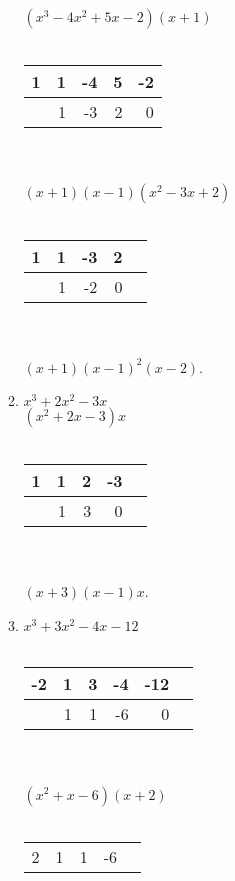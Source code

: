 \documentclass[10pt]{book}
\begin{document}
\begin{enumerate}
\begin{enumerate}
			\\
			\\
			$(x^3 - 4x^2 + 5x - 2)(x + 1)$
	 		\\
	 		\\
			\begin{tabular}{ l | r r r r }
			   1 & 1 & -4 & 5 & -2 \\
				\hline
			    & 1 & -3 & 2 & 0 \\
			\end{tabular}
			\\
			\\
			$(x + 1)(x - 1)(x^2 - 3x + 2)$
			\\
			\\
			\begin{tabular}{ l | r r r r }
			   1 & 1 & -3 & 2 \\
				\hline
			    & 1 & -2 & 0  \\
			\end{tabular}
			\\
			\\
			$(x + 1)(x - 1)^2(x - 2)$.
			\\
		\item %
			$x^3 + 2x^2 - 3x$
			\\
			$(x^2 + 2x - 3)x$
			\\
			\\
			\begin{tabular}{ l | r r r r }
			  1 & 1 & 2 & -3 \\
				\hline
			    & 1 & 3 & 0 \\
			\end{tabular}
			\\
			\\
			$(x + 3)(x - 1)x$.
			\\
			\item %
			$x^3+3x^2-4x-12$
			\\
			\\
			\begin{tabular}{ l | r r r r r }
			  -2 & 1 & 3 & -4 & -12 \\
				\hline
			    & 1 & 1 & -6 & 0 \\
			\end{tabular}
			\\
			\\
			$(x^2+x-6)(x+2)$
			\\
			\\
			\begin{tabular}{ l | r r r r }
			  2 & 1 & 1 & -6 \\

\end{tabular}
\end{enumerate}
\end{enumerate}
\end{document}

